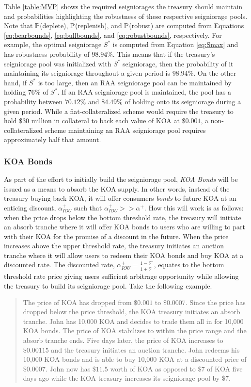 Table \ref{table:MVP} shows the required seigniorages the treasury should maintain and probabilities highlighting the robustness of these respective seigniorage pools. Note that $\mathbb{P}$(deplete), $\mathbb{P}$(replenish), and $\mathbb{P}$(robust) are computed from Equations \ref{eq:bearbounds}, \ref{eq:bullbounds}, and \ref{eq:robustbounds}, respectively. For example, the optimal seigniorage $S^*$ is computed from Equation \ref{eq:Smax} and has robustness probability of $98.94\%$. This means that if the treasury's seigniorage pool was initialized with $S^*$ seigniorage, then the probability of it maintaining its seigniorage throughout a given period is $98.94\%$. On the other hand, if $S^*$ is too large, then an RAA seigniorage pool can be maintained by holding $76\%$ of $S^*$. If an RAA seigniorage pool is maintained, the pool has a probability between $70.12\%$ and $84.49\%$ of holding onto its seigniorage during a given period. While a fiat-collateralized scheme would require the treasury to hold $\$30$ million in collateral to back each value of KOA at $\$0.001$, a non-collateralized scheme maintaining an RAA seigniorage pool requires approximately half that amount.

\subsubsection{KOA Bonds}

As part of the effort to initially build the seigniorage pool, \textit{KOA Bonds} will be issued as a means to absorb the KOA supply. In other words, instead of the treasury buying back KOA, it will offer consumers \textit{bonds} to future KOA at an enticing discount, $\alpha^+_{IOU}$ such that $\alpha^+_{IOU} >> \alpha^+$. How this will work is as follows: when the price drops below the bottom threshold rate, the treasury will initiate an absorb tranche where it will offer KOA bonds to users who are willing to part with their KOA for the promise of a discount in the future. When the price increases above the upper threshold rate, the treasury initiates an auction tranche where it will allow users to redeem their KOA bonds and buy KOA at a discounted rate. The discounted rate, $\alpha^+_{IOU} = \frac{1 - \delta^-}{1+\delta^+}$, equates to the bottom threshold rate price giving users sufficient arbitrage opportunity while allowing the treasury to build its seigniorage pool. Take the following example.
%
\begin{quote}
The price of KOA has dropped from $\$0.001$ to $\$0.0007$. Since the price has dropped below the price threshold, the KOA treasury initiates an absorb tranche. John has 10,000 KOA and decides to trade them all in for 10,000 KOA bonds. The price of KOA stabilizes to within the price range and the absorb tranche ends. Five days later, the price of KOA increases to $\$0.00115$ and the treasury initiates an auction tranche. John redeems his 10,000 KOA bonds and is able to buy 10,000 KOA at a discounted price of $\$0.0007$. John now has $\$11.5$ worth of KOA as opposed to $\$7$ of KOA five days ago while the KOA treasury increases its seigniorage pool by $\$7$.
\end{quote}

